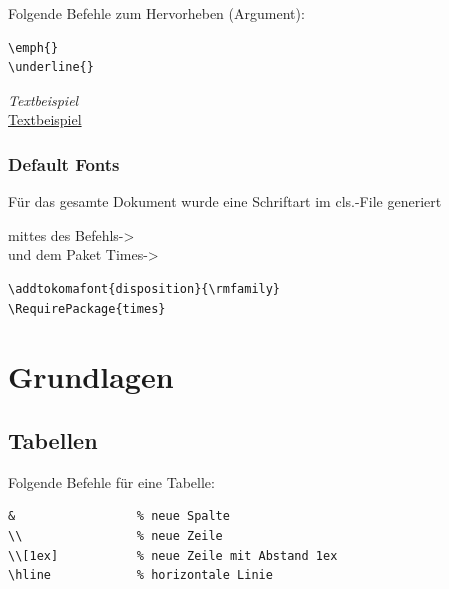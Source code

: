 \documentclass{like}
\begin{document}
\par\bigskip


Folgende Befehle zum Hervorheben (Argument):%

\begin{minipage}{0.2\textwidth}
\begin{verbatim}
\emph{}
\underline{}
\end{verbatim}
\end{minipage}\quad
\begin{minipage}{0.4\textwidth}
\emph{Textbeispiel}\\
\underline{Textbeispiel}
\end{minipage}
\subsection{Default Fonts}
Für das gesamte Dokument wurde eine Schriftart im cls.-File generiert\par\nopagebreak
\begin{minipage}[ht!]{0.4\textwidth}
mittes des Befehls->\\
und dem Paket Times->\\
\end{minipage}
\begin{minipage}[ht!]{0.4\textwidth}
\vspace*{-.6cm}
\begin{verbatim}
\addtokomafont{disposition}{\rmfamily}
\RequirePackage{times} 
\end{verbatim}
\end{minipage}


\chapter{Grundlagen}


\section{Tabellen}

Folgende Befehle für eine Tabelle:%


\qquad\begin{minipage}{0.8\textwidth}
\begin{verbatim}
&                 % neue Spalte
\\                % neue Zeile
\\[1ex]           % neue Zeile mit Abstand 1ex
\hline            % horizontale Linie
\end{verbatim}
\end{minipage}\par\bigskip
\end{document}
